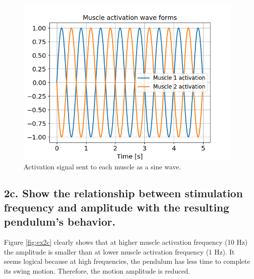\documentclass{cmc}
\begin{document}
\begin{figure}[H]
  \centering
  \includegraphics[scale=0.55]{figures/ex2b-c/Muscle_activation_wave_forms.png}
  \caption{Activation signal sent to each muscle as a sine wave.}
  \label{fig:2b-activation}
\end{figure}


\subsection*{2c. Show the relationship between stimulation
  frequency and amplitude with the resulting pendulum's behavior.}
\label{sec:2e}
Figure \ref{fig:ex2c} clearly shows that at higher muscle activation frequency (10 Hz) the amplitude is smaller than at lower muscle activation frequency (1 Hz). It seems logical because at high frequencies, the pendulum has less time to complete its swing motion. Therefore, the motion amplitude is reduced. 
\end{document}
